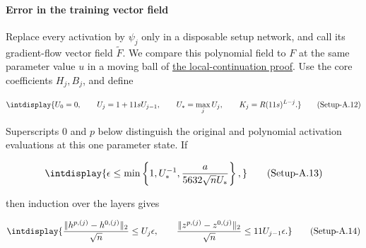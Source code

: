 \paragraph{Error in the training vector field}
\label{int:setup-activation-3}
\mbox{}\par\smallskip


Replace every activation by \(\psi_j\) only in a disposable setup network, and call its gradient-flow vector field \(\widetilde F\). We compare this polynomial field to \(F\) at the same parameter value \(u\) in a moving ball of \hyperref[int:setup-core]{the local-continuation proof}. Use the core coefficients \(H_j,\allowbreak B_j\), and define


\label{int:eq-setup-a-12}
\begingroup\renewcommand{\theHequation}{intdisplay.975}
\begin{equation}
\intdisplay{
U_0=0,\qquad U_j=1+11sU_{j-1},\qquad U_*=\max_jU_j,
\qquad K_j=R(11s)^{L-j}.
}
\tag{Setup-A.12}
\label{int:eq-0499-setup-a-12}
\end{equation}
\endgroup


Superscripts \(0\) and \(p\) below distinguish the original and polynomial activation evaluations at this one parameter state. If


\label{int:eq-setup-a-13}
\begingroup\renewcommand{\theHequation}{intdisplay.976}
\begin{equation}
\intdisplay{
\epsilon\le\min\left\{1,U_*^{-1},
       \frac{a}{5632\sqrt nU_*}\right\},
}
\tag{Setup-A.13}
\label{int:eq-0500-setup-a-13}
\end{equation}
\endgroup


then induction over the layers gives


\label{int:eq-setup-a-14}
\begingroup\renewcommand{\theHequation}{intdisplay.977}
\begin{equation}
\intdisplay{
\frac{\|h^{p,(j)}-h^{0,(j)}\|_2}{\sqrt n}\le U_j\epsilon,
\qquad
\frac{\|z^{p,(j)}-z^{0,(j)}\|_2}{\sqrt n}
 \le11U_{j-1}\epsilon.
}
\tag{Setup-A.14}
\label{int:eq-0501-setup-a-14}
\end{equation}
\endgroup


